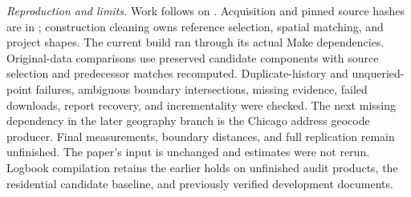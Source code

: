 \textit{Reproduction and limits.} Work follows  on
. Acquisition and pinned source hashes are in
; construction cleaning owns
reference selection, spatial matching, and project shapes. The current build ran
through its actual Make dependencies. Original-data comparisons use preserved
candidate components with source selection and predecessor matches recomputed.
Duplicate-history and unqueried-point failures, ambiguous boundary intersections,
missing evidence, failed downloads, report recovery, and incrementality were checked.
The next missing dependency in the later geography branch is the Chicago address
geocode producer. Final measurements, boundary distances, and full replication
remain unfinished. The paper's input is unchanged and estimates were not rerun.
Logbook compilation retains the earlier holds on unfinished audit products,
the residential candidate baseline, and previously verified development documents.

